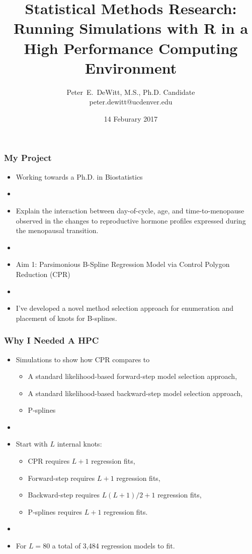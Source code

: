 \documentclass[10pt]{beamer}
\author[Peter~E.~DeWitt]{Peter~E.~DeWitt, M.S., Ph.D. Candidate\\{peter.dewitt@ucdenver.edu}\vspace{0.25in}}
\title[]{Statistical Methods Research:\\Running Simulations with R in a High Performance
Computing Environment}
\institute[CSPH, UCD, BIOS]{Colorado School of Public Health\\University of Colorado Denver\\Department of Biostatistics and Informatics}
\date{14 Feburary 2017}
\begin{document}
 
\watermarkoff

\begin{frame}[t,plain]
  \titlepage
\end{frame}

\begin{frame}
  \frametitle{My Project}
  \begin{itemize}
    \item Working towards a Ph.D. in Biostatistics
    \item[]
    \item Explain the interaction between day-of-cycle, age, and time-to-menopause
      observed in the changes to reproductive hormone profiles expressed during
      the menopausal transition.
    \item[]
    \item Aim 1: Parsimonious B-Spline Regression Model via Control Polygon
      Reduction (CPR)
    \item[]
    \item I've developed a novel method selection approach for enumeration and
      placement of knots for B-splines.  
  \end{itemize}
\end{frame}

\begin{frame}
  \frametitle{Why I Needed A HPC}
  \begin{itemize}
    \item Simulations to show how CPR compares to
      \begin{itemize}
        \item A standard likelihood-based forward-step model selection approach,
        \item A standard likelihood-based backward-step model selection approach,
        \item P-splines
      \end{itemize}

    \item[]

    \item Start with $L$ internal knots:
      \begin{itemize}
        \item CPR requires $L + 1$ regression fits,
        \item Forward-step requires $L + 1$ regression fits,
        \item Backward-step requires $L(L+1)/2 + 1$ regression fits,
        \item P-splines requires $L + 1$ regression fits.
      \end{itemize}

    \item[]

    \item For $L = 80$ a total of 3,484 regression models to fit.
      
  \end{itemize}
\end{frame}
\end{document}
